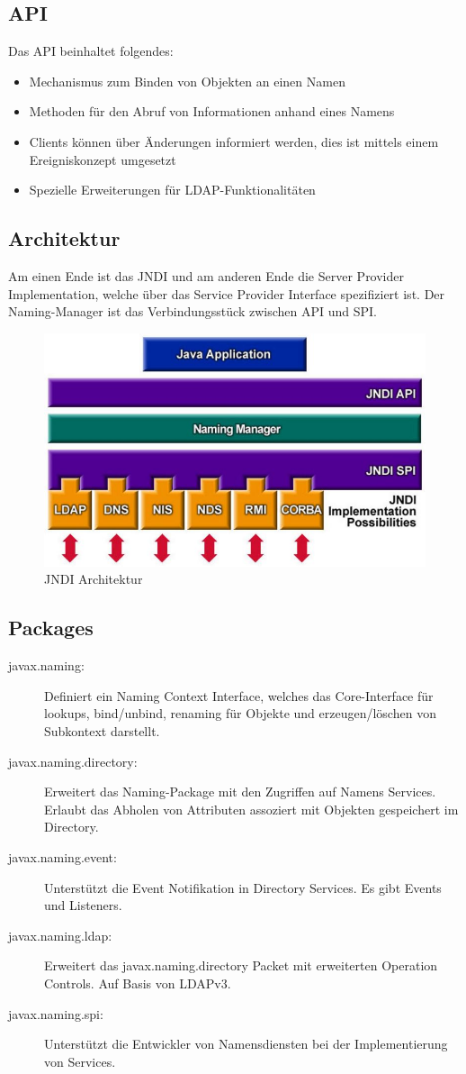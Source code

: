 \subsection{API}
Das API beinhaltet folgendes:
\begin{itemize}
	\item Mechanismus zum Binden von Objekten an einen Namen
	\item Methoden für den Abruf von Informationen anhand eines Namens
	\item Clients können über Änderungen informiert werden, dies ist mittels einem Ereigniskonzept umgesetzt
	\item Spezielle Erweiterungen für LDAP-Funktionalitäten
\end{itemize}

\subsection{Architektur}
Am einen Ende ist das JNDI und am anderen Ende die Server Provider Implementation, welche über das Service Provider Interface spezifiziert ist. Der Naming-Manager ist das Verbindungsstück zwischen API und SPI.

\begin{figure}[h!]
\centering
\includegraphics[width=0.5\linewidth]{fig/jndi-architecture}
\caption{JNDI Architektur}
\label{fig:jndi-architecture}
\end{figure}

\subsection{Packages}
\begin{description}
	\item[javax.naming:] Definiert ein Naming Context Interface, welches
	das Core-Interface für lookups, bind/unbind, renaming für
	Objekte und erzeugen/löschen von Subkontext darstellt.
	\item[javax.naming.directory:] Erweitert das Naming-Package mit den
	Zugriffen auf Namens Services. Erlaubt das Abholen von
	Attributen assoziert mit Objekten gespeichert im Directory.
	\item[javax.naming.event:] Unterstützt die Event Notifikation in
	Directory Services. Es gibt Events und Listeners.
	\item[javax.naming.ldap:] Erweitert das javax.naming.directory Packet
	mit erweiterten Operation Controls. Auf Basis von LDAPv3.
	\item[javax.naming.spi:] Unterstützt die Entwickler von
	Namensdiensten bei der Implementierung von Services. 
\end{description}

